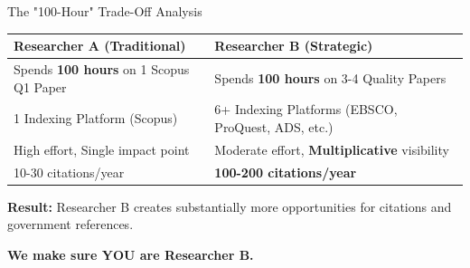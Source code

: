 \documentclass[10pt, aspectratio=169]{beamer}
\begin{document}
	\begin{frame}{The "100-Hour" Trade-Off Analysis}
		\begin{table}
			\centering
			\begin{tabular}{p{4.5cm} p{4.5cm}}
				\toprule
				\textbf{Researcher A (Traditional)} & \textbf{Researcher B (Strategic)} \\
				\midrule
				Spends \textbf{100 hours} on 1 Scopus Q1 Paper & Spends \textbf{100 hours} on 3-4 Quality Papers \\
				\midrule
				\textcolor{myred}{1 Indexing Platform} (Scopus) & \textcolor{mygreen}{6+ Indexing Platforms} (EBSCO, ProQuest, ADS, etc.) \\
				\midrule
				High effort, Single impact point & Moderate effort, \textbf{Multiplicative} visibility \\
				\midrule
				\textcolor{myred}{10-30 citations/year} & \textcolor{mygreen}{\textbf{100-200 citations/year}} \\
				\bottomrule
			\end{tabular}
		\end{table}
		\vspace{0.3cm}
		\begin{center}
			\textbf{Result:} Researcher B creates substantially more opportunities for \textcolor{myorange}{citations} and \textcolor{myorange}{government references}.
			
			\vspace{0.2cm}
			\textcolor{myblue}{\textbf{We make sure YOU are Researcher B.}}
		\end{center}
	\end{frame}
	
\end{document}
